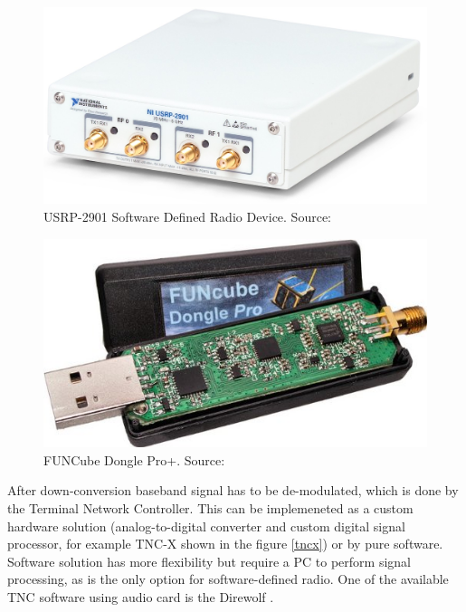 \begin{minipage}{\linewidth}
    \centering
    \begin{minipage}{0.45\linewidth}
        \begin{figure}[H]
            \centering
            \includegraphics[width=0.3\paperwidth]{img/1/ni_2901.png}
            \caption{USRP-2901 Software Defined Radio Device. Source: \cite{ni_2901}}
            \label{ni_2901}
        \end{figure}
    \end{minipage}
    \hspace{0.05\linewidth}
    \begin{minipage}{0.45\linewidth}
        \begin{figure}[H]
            \centering
            \includegraphics[width=0.3\paperwidth]{img/1/funcube.jpg}
            \caption{FUNCube Dongle Pro+. Source: \cite{funcube}}
            \label{funcube}
        \end{figure}
    \end{minipage}
\end{minipage}

After down-conversion baseband signal has to be de-modulated, which is done by the Terminal Network Controller. This can be implemeneted as a custom hardware solution (analog-to-digital converter and custom digital signal processor, for example TNC-X shown in the figure \ref{tncx}) or by pure software. Software solution has more flexibility but require a PC to perform signal processing, as is the only option for software-defined radio. One of the available TNC software using audio card is the Direwolf \cite{direwolf}.

